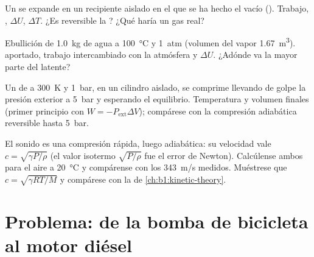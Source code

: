\begin{exercise}[$\star\star$]\label{exo:b1:first-law:9}
Un  se expande en un recipiente aislado en el que se ha hecho
el vacío (). Trabajo, , $\Delta U$, $\Delta T$. ¿Es
reversible la ? ¿Qué haría un gas real?
\end{exercise}

\begin{exercise}[$\star\star\star$]\label{exo:b1:first-law:10}
Ebullición de \qty{1.0}{kg} de agua a \qty{100}{\degreeCelsius} y \qty{1}{atm}
(volumen del vapor \qty{1.67}{m^3}).  aportado, trabajo intercambiado
con la atmósfera y $\Delta U$. ¿Adónde va la mayor parte del  latente?
\end{exercise}

\begin{exercise}[$\star\star\star$]\label{exo:b1:first-law:11}
Un  de  a \qty{300}{K} y \qty{1}{bar}, en un cilindro
aislado, se comprime llevando de golpe la presión exterior a \qty{5}{bar} y
esperando el equilibrio. Temperatura y volumen finales (primer principio
con $W = -P_{\mathrm{ext}}\Delta V$); compárese con la compresión adiabática
reversible hasta \qty{5}{bar}.
\end{exercise}

\begin{exercise}[$\star\star\star$]\label{exo:b1:first-law:12}
El sonido es una compresión rápida, luego adiabática: su velocidad vale $c = \sqrt{\gamma P/\rho}$
(el valor isotermo $\sqrt{P/\rho}$ fue el error de Newton). Calcúlense
ambos para el aire a \qty{20}{\degreeCelsius} y compárense con los
\qty{343}{m/s} medidos. Muéstrese que $c = \sqrt{\gamma RT/M}$ y compárese
con la  de \cref{ch:b1:kinetic-theory}.
\end{exercise}

\section{Problema: de la bomba de bicicleta al motor diésel}


